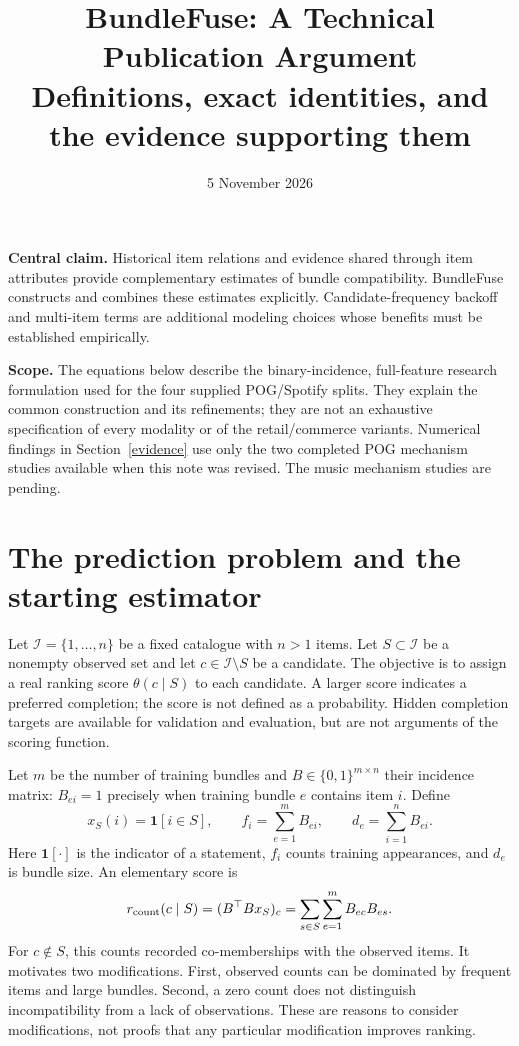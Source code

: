 \documentclass[11pt,a4paper]{article}
\title{\textcolor{ink}{BundleFuse: A Technical Publication Argument}\\[5pt]\large Definitions, exact identities, and the evidence supporting them}
\author{}\date{5 November 2026}
\newcommand{\I}{\mathcal I}
\begin{document}
\maketitle
\vspace{-20pt}
\textbf{Central claim.} Historical item relations and evidence shared through item
attributes provide complementary estimates of bundle compatibility. BundleFuse
constructs and combines these estimates explicitly. Candidate-frequency backoff
and multi-item terms are additional modeling choices whose benefits must be
established empirically.

\textbf{Scope.} The equations below describe the binary-incidence, full-feature
research formulation used for the four supplied POG/Spotify splits. They explain
the common construction and its refinements; they are not an exhaustive specification
of every modality or of the retail/commerce variants. Numerical findings in
Section~\ref{evidence} use only the two completed POG mechanism studies available
when this note was revised. The music mechanism studies are pending.

\section{The prediction problem and the starting estimator}
Let $\I=\{1,\ldots,n\}$ be a fixed catalogue with $n>1$ items. Let
$S\subset\I$ be a nonempty observed set and let $c\in\I\setminus S$ be a candidate.
The objective is to assign a real ranking score $\theta(c\mid S)$ to each candidate.
A larger score indicates a preferred completion; the score is not defined as a
probability. Hidden completion targets are available for validation and evaluation,
but are not arguments of the scoring function.

Let $m$ be the number of training bundles and $B\in\{0,1\}^{m\times n}$ their incidence
matrix: $B_{ei}=1$ precisely when training bundle $e$ contains item $i$. Define
\[
 x_S(i)=\mathbf1[i\in S],\qquad f_i=\sum_{e=1}^mB_{ei},\qquad
 d_e=\sum_{i=1}^nB_{ei}.
\]
Here $\mathbf1[\cdot]$ is the indicator of a statement, $f_i$ counts training
appearances, and $d_e$ is bundle size. An elementary score is
\begin{equation}\label{raw}
 r_{\rm count}(c\mid S)=(B^\top Bx_S)_c
 =\sum_{s\in S}\sum_{e=1}^m B_{ec}B_{es}.
\end{equation}
For $c\notin S$, this counts recorded co-memberships with the observed items.
It motivates two modifications. First, observed counts can be dominated by frequent
items and large bundles. Second, a zero count does not distinguish incompatibility
from a lack of observations. These are reasons to consider modifications, not proofs
that any particular modification improves ranking.
\end{document}
